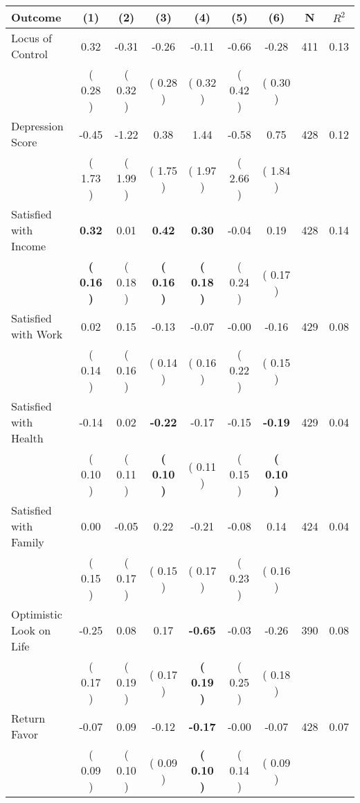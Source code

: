 \begin{tabular}{lcccccccc}
\toprule
 \textbf{Outcome} & \textbf{(1)} & \textbf{(2)} & \textbf{(3)} & \textbf{(4)} & \textbf{(5)} & \textbf{(6)} & \textbf{N} & \textbf{$ R^2$} \\
\midrule
Locus of Control &      0.32 &     -0.31 &     -0.26 &     -0.11 &     -0.66 &     -0.28 & 411 &       0.13 \\ 
 & (     0.28 ) & (     0.32 ) & (     0.28 ) & (     0.32 ) & (     0.42 ) & (     0.30 ) & \\
Depression Score &     -0.45 &     -1.22 &      0.38 &      1.44 &     -0.58 &      0.75 & 428 &       0.12 \\ 
 & (     1.73 ) & (     1.99 ) & (     1.75 ) & (     1.97 ) & (     2.66 ) & (     1.84 ) & \\
Satisfied with Income & \textbf{     0.32} &      0.01 & \textbf{     0.42} & \textbf{     0.30} &     -0.04 &      0.19 & 428 &       0.14 \\ 
 & \textbf{(     0.16 )} & (     0.18 ) & \textbf{(     0.16 )} & \textbf{(     0.18 )} & (     0.24 ) & (     0.17 ) & \\
Satisfied with Work &      0.02 &      0.15 &     -0.13 &     -0.07 &     -0.00 &     -0.16 & 429 &       0.08 \\ 
 & (     0.14 ) & (     0.16 ) & (     0.14 ) & (     0.16 ) & (     0.22 ) & (     0.15 ) & \\
Satisfied with Health &     -0.14 &      0.02 & \textbf{    -0.22} &     -0.17 &     -0.15 & \textbf{    -0.19} & 429 &       0.04 \\ 
 & (     0.10 ) & (     0.11 ) & \textbf{(     0.10 )} & (     0.11 ) & (     0.15 ) & \textbf{(     0.10 )} & \\
Satisfied with Family &      0.00 &     -0.05 &      0.22 &     -0.21 &     -0.08 &      0.14 & 424 &       0.04 \\ 
 & (     0.15 ) & (     0.17 ) & (     0.15 ) & (     0.17 ) & (     0.23 ) & (     0.16 ) & \\
Optimistic Look on Life &     -0.25 &      0.08 &      0.17 & \textbf{    -0.65} &     -0.03 &     -0.26 & 390 &       0.08 \\ 
 & (     0.17 ) & (     0.19 ) & (     0.17 ) & \textbf{(     0.19 )} & (     0.25 ) & (     0.18 ) & \\
Return Favor &     -0.07 &      0.09 &     -0.12 & \textbf{    -0.17} &     -0.00 &     -0.07 & 428 &       0.07 \\ 
 & (     0.09 ) & (     0.10 ) & (     0.09 ) & \textbf{(     0.10 )} & (     0.14 ) & (     0.09 ) & \\

\end{tabular}
